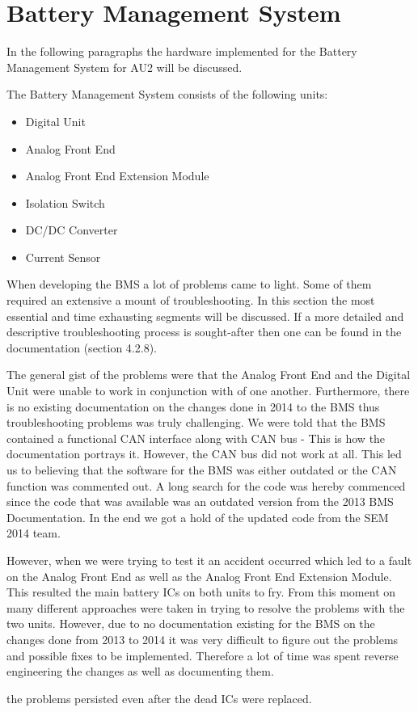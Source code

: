 \section{Battery Management System}
In the following paragraphs the hardware implemented for the Battery Management System for AU2 will be discussed. 

The Battery Management System consists of the following units:
\begin{itemize}
	\item{Digital Unit}
	\item{Analog Front End}
	\item{Analog Front End Extension Module}
	\item{Isolation Switch}
	\item{DC/DC Converter}
	\item{Current Sensor}
\end{itemize}


When developing the BMS a lot of problems came to light. Some of them required an extensive a mount of troubleshooting. In this section the most essential and time exhausting segments will be discussed. If a more detailed and descriptive troubleshooting process is sought-after then one can be found in the documentation\cite{AU2} (section 4.2.8).

The general gist of the problems were that the Analog Front End and the Digital Unit were unable to work in conjunction with of one another. Furthermore, there is no existing documentation on the changes done in 2014 to the BMS thus troubleshooting problems was truly challenging.
We were told that the BMS contained a functional CAN interface along with CAN bus - This is how the documentation portrays it. However, the CAN bus did not work at all. This led us to believing that the software for the BMS was either outdated or the CAN function was commented out. A long search for the code was hereby commenced since the code that was available was an outdated version from the 2013 BMS Documentation\cite{BMSDocumentation}. In the end we got a hold of the updated code from the SEM 2014 team.

However, when we were trying to test it an accident occurred which led to a fault on the Analog Front End as well as the Analog Front End Extension Module. This resulted the main battery ICs on both units to fry.
From this moment on many different approaches were taken in trying to resolve the problems with the two units. However, due to no documentation existing for the BMS on the changes done from 2013 to 2014 it was very difficult to figure out the problems and possible fixes to be implemented. Therefore a lot of time was spent reverse engineering the changes as well as documenting them. 


the problems persisted even after the dead ICs were replaced.
